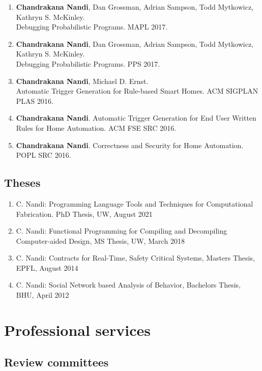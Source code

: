 \documentclass[margin, 10pt]{res} %
\begin{document}
\begin{resume}
\begin{enumerate}
\item \textbf{Chandrakana Nandi}, Dan Grossman, Adrian Sampson, Todd Mytkowicz, Kathryn S. McKinley. \\ Debugging Probabilistic Programs. MAPL 2017.
\item \textbf{Chandrakana Nandi}, Dan Grossman, Adrian Sampson, Todd Mytkowicz, Kathryn S. McKinley. \\ Debugging Probabilistic Programs. PPS 2017.
\item \textbf{Chandrakana Nandi}, Michael D. Ernst. \\ Automatic Trigger Generation for Rule-based Smart Homes. ACM SIGPLAN PLAS 2016.
\item \textbf{Chandrakana Nandi}. Automatic Trigger Generation for End User Written Rules for Home Automation. ACM FSE SRC 2016.
\item \textbf{Chandrakana Nandi}. Correctness and Security for Home Automation. POPL SRC 2016.
\end{enumerate}

\subsection{Theses}
\begin{enumerate}
\item C. Nandi: Programming Language Tools and Techniques for Computational Fabrication. {PhD Thesis}, UW, August 2021
\item C. Nandi: Functional Programming for Compiling and Decompiling Computer-aided Design, {MS Thesis}, UW, March 2018
\item C. Nandi: Contracts for Real-Time, Safety Critical Systems, {Masters Thesis}, EPFL, August 2014
\item C. Nandi: Social Network based Analysis of Behavior, {Bachelors Thesis}, BHU, April 2012
\end{enumerate}

\section{Professional services}


\subsection{Review committees}


\end{resume}
\end{document}
